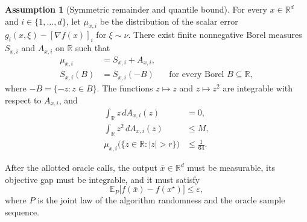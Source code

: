 \documentclass[10pt]{article}
\theoremstyle{definition}
\newtheorem{assumption}{Assumption}
\begin{document}
\begin{assumption}[Symmetric remainder and quantile bound]
For every $x\in\mathbb{R}^d$ and $i\in\{1,\ldots,d\}$, let $\mu_{x,i}$ be the distribution of the scalar error $g_i(x,\xi)-[\nabla f(x)]_i$ for $\xi\sim\nu$. There exist finite nonnegative Borel measures $S_{x,i}$ and $A_{x,i}$ on $\mathbb{R}$ such that
\[
\begin{aligned}
\mu_{x,i}&=S_{x,i}+A_{x,i},\\
S_{x,i}(B)&=S_{x,i}(-B)
&&\text{for every Borel }B\subseteq\mathbb{R},
\end{aligned}
\]
where $-B=\{-z:z\in B\}$. The functions $z\mapsto z$ and $z\mapsto z^2$ are integrable with respect to $A_{x,i}$, and
\[
\begin{aligned}
\int_{\mathbb{R}} z\,dA_{x,i}(z)&=0,\\
\int_{\mathbb{R}} z^2\,dA_{x,i}(z)&\leq M,\\
\mu_{x,i}\bigl(\{z\in\mathbb{R}:|z|>r\}\bigr)&\leq\frac{1}{64}.
\end{aligned}
\]
\end{assumption}

After the allotted oracle calls, the output $\bar{x}\in\mathbb{R}^d$ must be measurable, its objective gap must be integrable, and it must satisfy
\[
\mathbb{E}_{P}\bigl[f(\bar{x})-f(x^\star)\bigr]\leq\varepsilon,
\]
where $P$ is the joint law of the algorithm randomness and the oracle sample sequence.
\end{document}
